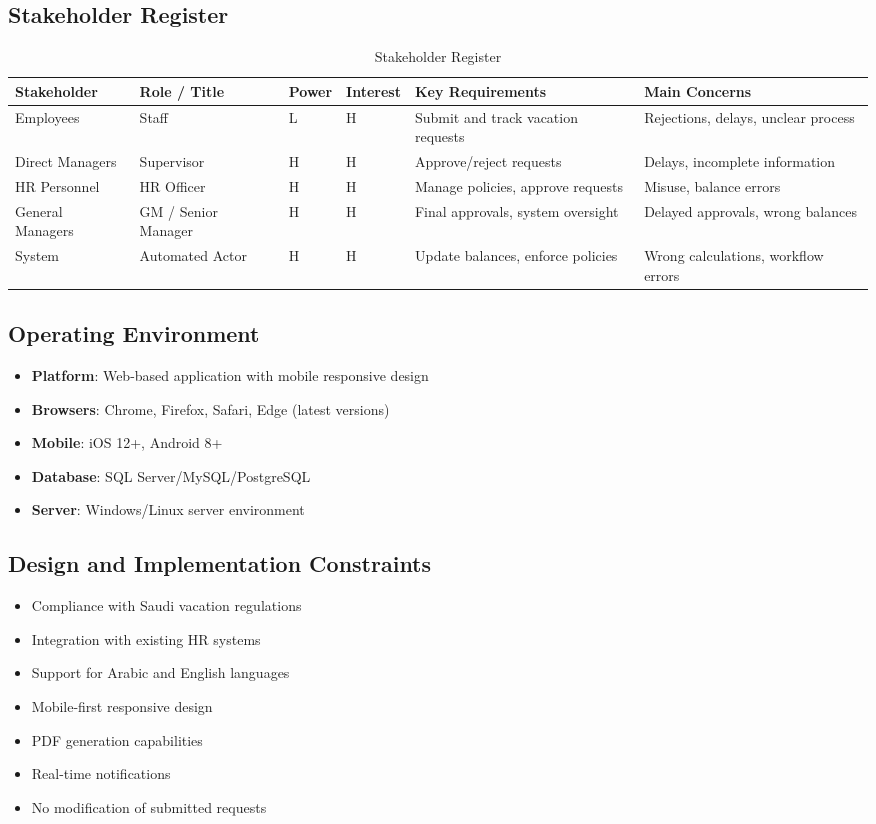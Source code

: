 \documentclass[12pt,a4paper]{article}
\begin{document}
\subsection{Stakeholder Register}
\begin{table}[H]
\centering
\begin{tabular}{|p{3cm}|p{3cm}|p{1cm}|p{1.5cm}|p{4cm}|p{4cm}|}
\hline
\textbf{Stakeholder} & \textbf{Role / Title} & \textbf{Power} & \textbf{Interest} & \textbf{Key Requirements} & \textbf{Main Concerns} \\
\hline
Employees & Staff & L & H & Submit and track vacation requests & Rejections, delays, unclear process \\
\hline
Direct Managers & Supervisor & H & H & Approve/reject requests & Delays, incomplete information \\
\hline
HR Personnel & HR Officer & H & H & Manage policies, approve requests & Misuse, balance errors \\
\hline
General Managers & GM / Senior Manager & H & H & Final approvals, system oversight & Delayed approvals, wrong balances \\
\hline
System & Automated Actor & H & H & Update balances, enforce policies & Wrong calculations, workflow errors \\
\hline
\end{tabular}
\caption{Stakeholder Register}
\end{table}

\subsection{Operating Environment}
\begin{itemize}
    \item \textbf{Platform}: Web-based application with mobile responsive design
    \item \textbf{Browsers}: Chrome, Firefox, Safari, Edge (latest versions)
    \item \textbf{Mobile}: iOS 12+, Android 8+
    \item \textbf{Database}: SQL Server/MySQL/PostgreSQL
    \item \textbf{Server}: Windows/Linux server environment
\end{itemize}

\subsection{Design and Implementation Constraints}
\begin{itemize}
    \item Compliance with Saudi vacation regulations
    \item Integration with existing HR systems
    \item Support for Arabic and English languages
    \item Mobile-first responsive design
    \item PDF generation capabilities
    \item Real-time notifications
    \item No modification of submitted requests
\end{itemize}
\end{document}
